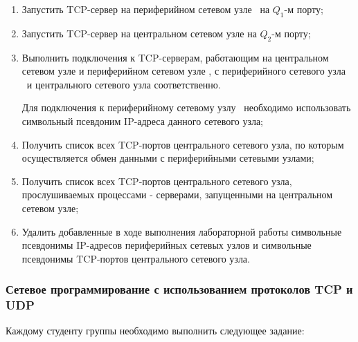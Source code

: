 \begin{enumerate}
		\item Запустить TCP-сервер на периферийном сетевом узле \second\ на $Q_1$-м порту;
		\item Запустить TCP-сервер на центральном сетевом узле на $Q_2$-м порту;
		\item Выполнить подключения к TCP-серверам, работающим на центральном сетевом узле и периферийном сетевом
		узле \second, с периферийного сетевого узла\\\first\ и центрального сетевого узла соответственно.

		Для подключения к периферийному сетевому узлу \second\ необходимо использовать символьный псевдоним IP-адреса
		данного сетевого узла;

		\item Получить список всех TCP-портов центрального сетевого узла, по которым осуществляется обмен данными с
		периферийными сетевыми узлами;
		\item Получить список всех TCP-портов центрального сетевого узла, прослушиваемых процессами - серверами,
		запущенными на центральном сетевом узле;
		\item Удалить добавленные в ходе выполнения лабораторной работы символьные псевдонимы IP-адресов периферийных
		сетевых узлов и символьные псевдонимы TCP-портов центрального сетевого узла.

	\end{enumerate}

\subsubsection{Сетевое программирование с использованием протоколов TCP и UDP}
\label{task:l2t2}

	Каждому студенту группы необходимо выполнить следующее задание:

